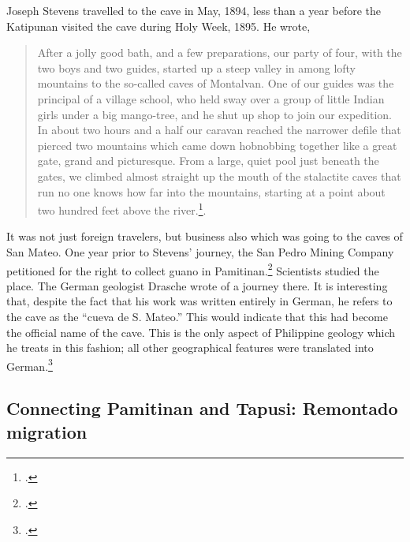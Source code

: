 Joseph Stevens travelled to the cave in May, 1894, less than a year before the Katipunan visited the cave during Holy Week, 1895. He wrote,

\begin{quote}
After a jolly good bath, and a few preparations, our party of four, with the two boys and two guides, started up a steep valley in among lofty mountains to the so-called caves of Montalvan. One of our guides was the principal of a village school, who held sway over a group of little Indian girls under a big mango-tree, and he shut up shop to join our expedition. In about two hours and a half our caravan reached the narrower defile that pierced two mountains which came down hobnobbing together like a great gate, grand and picturesque. From a large, quiet pool just beneath the gates, we climbed almost straight up the mouth of the stalactite caves that run no one knows how far into the mountains, starting at a point about two hundred feet above the river.\footcite[89-90]{Stevens1898}.
\end{quote}

It was not just foreign travelers, but business also which was going to the caves of San Mateo. One year prior to Stevens' journey, the San Pedro Mining Company petitioned for the right to collect guano in Pamitinan.\footcite[113]{Burritt1902} Scientists studied the place. The German geologist Drasche wrote of a journey there. It is interesting that, despite the fact that his work was written entirely in German, he refers to the cave as the \enquote{cueva de S. Mateo.} This would indicate that this had become the official name of the cave. This is the only aspect of Philippine geology which he treats in this fashion; all other geographical features were translated into German.\footcite{Drasche1878}

\subsection{Connecting Pamitinan and Tapusi: Remontado migration}

